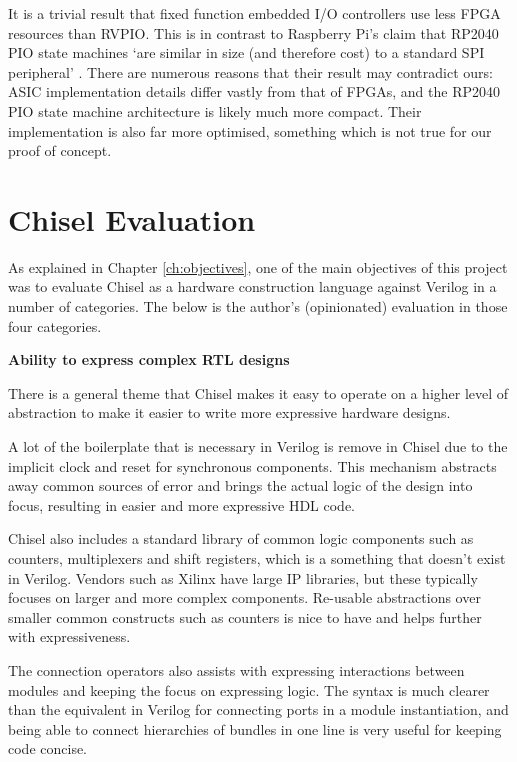 It is a trivial result that fixed function embedded I/O controllers use less FPGA resources than RVPIO. This is in contrast to Raspberry Pi's claim that RP2040 PIO state machines `are similar in size (and therefore cost) to a standard SPI peripheral' \cite{picosdk}. There are numerous reasons that their result may contradict ours: ASIC implementation details differ vastly from that of FPGAs, and the RP2040 PIO state machine architecture is likely much more compact. Their implementation is also far more optimised, something which is not true for our proof of concept.

\section{Chisel Evaluation}

As explained in Chapter \ref{ch:objectives}, one of the main objectives of this project was to evaluate Chisel as a hardware construction language against Verilog in a number of categories. The below is the author's (opinionated) evaluation in those four categories.

\textbf{Ability to express complex RTL designs}

There is a general theme that Chisel makes it easy to operate on a higher level of abstraction to make it easier to write more expressive hardware designs.

A lot of the boilerplate that is necessary in Verilog is remove in Chisel due to the implicit clock and reset for synchronous components. This mechanism abstracts away common sources of error and brings the actual logic of the design into focus, resulting in easier and more expressive HDL code.

Chisel also includes a standard library of common logic components such as counters, multiplexers and shift registers, which is a something that doesn't exist in Verilog. Vendors such as Xilinx have large IP libraries, but these typically focuses on larger and more complex components. Re-usable abstractions over smaller common constructs such as counters is nice to have and helps further with expressiveness.

The connection operators also assists with expressing interactions between modules and keeping the focus on expressing logic. The syntax is much clearer than the equivalent in Verilog for connecting ports in a module instantiation, and being able to connect hierarchies of bundles in one line is very useful for keeping code concise.

